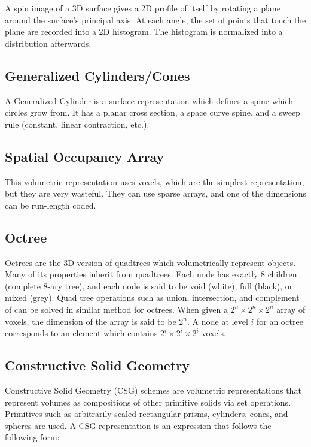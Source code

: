 \documentclass{article}
\begin{document}
\begin{multicols}{3}
A spin image of a 3D surface gives a 2D profile of itself by rotating a plane around the surface's principal axis. At each angle, the set of points that touch the plane are recorded into a 2D histogram. The histogram is normalized into a distribution afterwards.

\subsection{Generalized Cylinders/Cones}

A Generalized Cylinder is a surface representation which defines a spine which circles grow from. It has a planar cross section, a space curve spine, and a sweep rule (constant, linear contraction, etc.).


\subsection{Spatial Occupancy Array}

This volumetric representation uses voxels, which are the simplest representation, but they are very wasteful. They can use sparse arrays, and one of the dimensions can be run-length coded.

\subsection{Octree}

Octrees are the 3D version of quadtrees which volumetrically represent objects. Many of its properties inherit from quadtrees. Each node has exactly 8 children (complete 8-ary tree), and each node is said to be void (white), full (black), or mixed (grey). Quad tree operations such as union, intersection, and complement of can be solved in similar method for octrees.
When given a $2^n \times 2^n \times 2^n$ array of voxels, the dimension of the array is said to be $2^n$. A node at level $i$ for an octree corresponds to an element which contains $2^i \times 2^i \times 2^i$ voxels.

\subsection{Constructive Solid Geometry}

Constructive Solid Geometry (CSG) schemes are volumetric representations that represent volumes as compositions of other primitive solids via set operations. Primitives such as arbitrarily scaled rectangular prisms, cylinders, cones, and spheres are used. A CSG representation is an expression that follows the following form:


\end{multicols}
\end{document}
